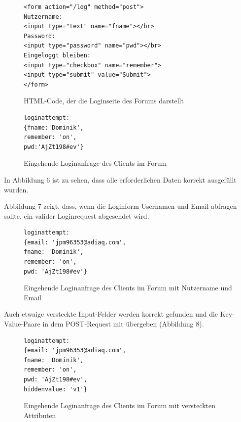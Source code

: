 \begin{figure}[ht]
\begin{lstlisting}[language=HTML5]
<form action="/log" method="post">
Nutzername: 
<input type="text" name="fname"></br>
Password: 
<input type="password" name="pwd"></br>
Eingeloggt bleiben: 
<input type="checkbox" name="remember">
<input type="submit" value="Submit">
</form>
\end{lstlisting}
\caption{HTML-Code, der die Loginseite des Forums darstellt}
\end{figure}


\begin{figure}[h!]
\begin{lstlisting}[language=HTML5]
loginattempt: 
{fname:'Dominik',
remember: 'on',
pwd:'AjZt198#ev'}
\end{lstlisting}
\caption{Eingehende Loginanfrage des Clients im Forum}
\end{figure}

In Abbildung 6 ist zu sehen, dass alle erforderlichen Daten korrekt ausgefüllt wurden.
\newpage

Abbildung 7 zeigt, dass, wenn die Loginform Usernamen und Email abfragen sollte, ein valider Loginrequest abgesendet wird.

\begin{figure}[h!]
\begin{lstlisting}[language=HTML5]
loginattempt:
{email: 'jpm96353@adiaq.com',
fname: 'Dominik',
remember: 'on',
pwd: 'AjZt198#ev'}
\end{lstlisting}
\caption{Eingehende Loginanfrage des Clients im Forum mit Nutzername und Email}
\end{figure}

Auch etwaige versteckte Input-Felder werden korrekt gefunden und die Key-Value-Paare in dem POST-Request mit übergeben (Abbildung 8).

\begin{figure}[h!]
\begin{lstlisting}[language=HTML5]
loginattempt:
{email: 'jpm96353@adiaq.com',
fname: 'Dominik',
remember: 'on',
pwd: 'AjZt198#ev',
hiddenvalue: 'v1'}
\end{lstlisting}
\caption{Eingehende Loginanfrage des Clients im Forum mit versteckten Attributen}
\end{figure}



